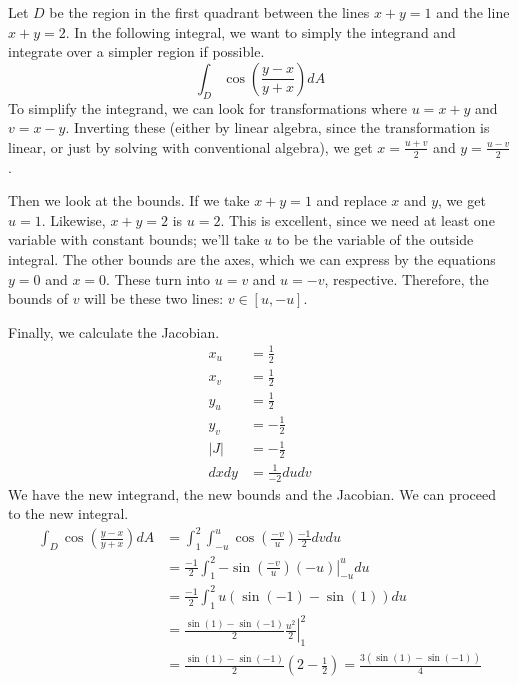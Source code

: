 \documentclass[fleqn,letterpaper]{report}
\begin{document}
\begin{example}
Let $D$ be the region in the first quadrant between the lines
$x+y = 1$ and the line $x+y =2$. In the following integral,
we want to simply the integrand and integrate over a simpler
region if possible.
\begin{equation*}
\int_D \cos \left( \frac{y-x}{y+x} \right) dA
\end{equation*}
To simplify the integrand, we can look for transformations
where $u = x+y$ and $v = x-y$. Inverting these (either by
linear algebra, since the transformation is linear, or just by
solving with conventional algebra), we get $x = \frac{u+v}{2}$
and $y = \frac{u-v}{2}$. 

Then we look at the bounds. If we take $x+y=1$ and replace $x$
and $y$, we get $u=1$. Likewise, $x+y=2$ is $u=2$. This is
excellent, since we need at least one variable with constant
bounds; we'll take $u$ to be the variable of the outside
integral. The other bounds are the axes, which we can express
by the equations $y=0$ and $x=0$. These turn into $u=v$ and
$u=-v$, respective. Therefore, the bounds of $v$ will be these
two lines: $v \in [u, -u]$.

Finally, we calculate the Jacobian.
\begin{align*}
x_u & = \frac{1}{2} \\
x_v & = \frac{1}{2} \\
y_u & = \frac{1}{2} \\
y_v & = -\frac{1}{2} \\
|J| & = -\frac{1}{2} \\
dx dy & = \frac{1}{-2} du dv
\end{align*}
We have the new integrand, the new bounds and the Jacobian. We
can proceed to the new integral.
\begin{align*}
\int_D \cos \left( \frac{y-x}{y+x} \right) dA & = \int_1^2 \int_{-u}^u
\cos \left( \frac{-v}{u} \right) \frac{-1}{2} dv du \\
& = \frac{-1}{2} \int_1^2 \left. -\sin \left( \frac{-v}{u} \right)
(-u) \right|_{-u}^{u} du \\
& = \frac{-1}{2} \int_1^2 u (\sin (-1) - \sin(1)) du \\
& = \frac{\sin (1) - \sin (-1)}{2} \left. \frac{u^2}{2}
\right|_1^2 \\
& = \frac{\sin (1) - \sin (-1)}{2} (2 - \frac{1}{2}) =
\frac{3(\sin(1) - \sin(-1))}{4} 
\end{align*}
\end{example}
\end{document}
